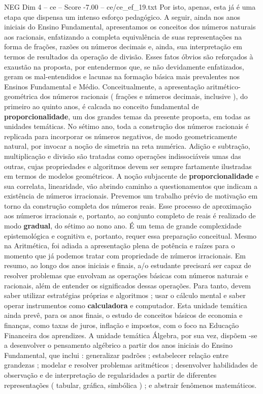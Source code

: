 \begin{textsample}{NEG Dim 4 – ce – Score -7.00 – ce/ce\_ef\_19.txt}
Por isto, apenas, esta já é uma etapa que dispensa um intenso esforço pedagógico.
A seguir, ainda nos anos iniciais do Ensino Fundamental, apresentamos os conceitos dos números naturais aos racionais, enfatizando a completa equivalência de suas representações na forma de frações, razões ou números decimais e, ainda, sua interpretação em termos de resultados da operação de divisão.
Esses fatos óbvios são reforçados à exaustão na proposta, por entendermos que, se não devidamente enfatizados, geram os mal-entendidos e lacunas na formação básica mais prevalentes nos Ensinos Fundamental e Médio.
Conceitualmente, a apresentação aritmético-geométrica dos números racionais ( frações e números decimais, inclusive ), do primeiro ao quinto anos, é calcada no conceito fundamental de \textbf{proporcionalidade}, um dos grandes temas da presente proposta, em todas as unidades temáticas.
No sétimo ano, toda a construção dos números racionais é replicada para incorporar os números negativos, de modo geometricamente natural, por invocar a noção de simetria na reta numérica.
Adição e subtração, multiplicação e divisão são tratadas como operações indissociáveis umas das outras, cujas propriedades e algoritmos devem ser sempre fartamente ilustradas em termos de modelos geométricos.
A noção subjacente de \textbf{proporcionalidade} e sua correlata, linearidade, vão abrindo caminho a questionamentos que indicam a existência de números irracionais.
Prevemos um trabalho prévio de motivação em torno da construção completa dos números reais.
Esse processo de aproximação aos números irracionais e, portanto, ao conjunto completo de reais é realizado de modo \textbf{gradual}, do sétimo ao nono ano.
É um tema de grande complexidade epistemológica e cognitiva e, portanto, requer essa preparação conceitual.
Mesmo na Aritmética, foi adiada a apresentação plena de potência e raízes para o momento que já podemos tratar com propriedade de números irracionais.
Em resumo, ao longo dos anos iniciais e finais, a/o estudante precisará ser capaz de resolver problemas que envolvam as operações básicas com números naturais e racionais, além de entender os significados dessas operações.
Para tanto, devem saber utilizar estratégias próprias e algoritmos ; usar o cálculo mental e saber operar instrumentos como \textbf{calculadora} e computador.
Esta unidade temática ainda prevê, para os anos finais, o estudo de conceitos básicos de economia e finanças, como taxas de juros, inflação e impostos, com o foco na Educação Financeira dos aprendizes.
A unidade temática Álgebra, por sua vez, dispõem -se a desenvolver o pensamento algébrico a partir dos anos iniciais do Ensino Fundamental, que inclui : generalizar padrões ; estabelecer relação entre grandezas ; modelar e resolver problemas aritméticos ; desenvolver habilidades de observação e de interpretação de regularidades a partir de diferentes representações ( tabular, gráfica, simbólica ) ; e abstrair fenômenos matemáticos.

\end{textsample}
